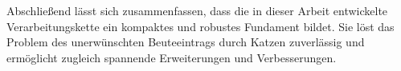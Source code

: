 \vspace{0.5cm}

Abschließend lässt sich zusammenfassen, dass die in dieser Arbeit entwickelte Verarbeitungskette ein kompaktes und robustes Fundament bildet. Sie löst das Problem des unerwünschten Beuteeintrags durch Katzen zuverlässig und ermöglicht zugleich spannende Erweiterungen und Verbesserungen.
